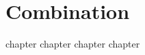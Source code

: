 
  \part{Combination}
  \label{part:combination}

{chapter}
{chapter}
{chapter}
{chapter}

\partended
